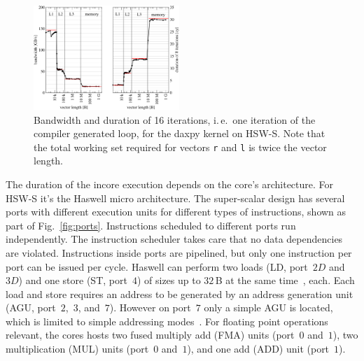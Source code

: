 \begin{figure}[tp]
  \centering
  \includegraphics[width=0.49\textwidth,clip=true]{images/daxpy-bw-hasep1-f-2.3-w-cy}
  \caption{Bandwidth and duration of 16 iterations, i.\,e.\ one iteration of the
compiler generated loop, for the daxpy kernel on HSW-S. Note that the total
working set required for vectors
\protect\texttt{r} and \texttt{l} is twice the vector length.}
  \label{fig:daxpy:perf}
\end{figure}

The duration of the incore execution depends on the core's architecture.
For HSW-S it's the Haswell micro architecture.
The super-scalar design has several ports with different execution units for
different types of instructions, shown as part of Fig.~\ref{fig:ports}.
Instructions scheduled to different ports run independently.
The instruction scheduler takes care that no data dependencies are violated.
{\color{orange} Instructions inside ports are pipelined, but only one instruction per port can
be issued per cycle.
Haswell can perform two loads (LD, port~$2D$ and~$3D$) and one store (ST,
port~$4$) of sizes up to $32$\,B at the same time~\cite{intel-orm-2016}, each.
Each load and store requires an address to be generated by an address
generation unit (AGU, port~$2$,~$3$, and~$7$).
However on port~$7$ only a simple AGU is located, which is limited to simple
addressing modes~\cite{intel-orm-2016,hofmann-2016-hsw}.
%
For floating point operations relevant, the cores hosts two fused multiply add
(FMA) units (port~$0$ and~$1$), two multiplication (MUL) units (port~$0$
and~$1$), and one add (ADD) unit (port~$1$).}


